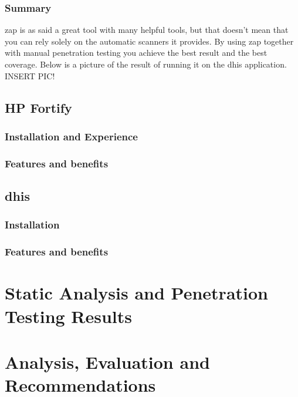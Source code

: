 \documentclass[11pt,english,a4paper]{report}
\begin{document}
\subsection{Summary}
\gls{zap} is as said a great tool with many helpful tools, but that doesn't mean that you can rely solely on the automatic scanners it provides. By using \gls{zap} together with manual penetration testing you achieve the best result and the best coverage. Below is a picture of the result of running it on the \gls{dhis} application.
INSERT PIC!
\section{HP Fortify}
\subsection{Installation and Experience}
\subsection{Features and benefits}
\section{\gls{dhis}}
\subsection{Installation}
\subsection{Features and benefits}



\chapter{Static Analysis and Penetration Testing Results}
\chapter{Analysis, Evaluation and Recommendations}
\end{document}

